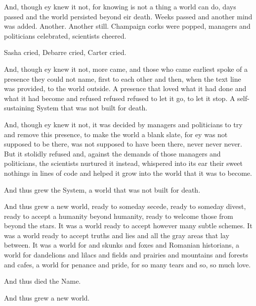 And, though ey knew it not, for knowing is not a thing a world can do, days passed and the world persisted beyond eir death. Weeks passed and another mind was added. Another. Another still. Champaign corks were popped, managers and politicians celebrated, scientists cheered.

Sasha cried, Debarre cried, Carter cried.

And, though ey knew it not, more came, and those who came earliest spoke of a presence they could not name, first to each other and then, when the text line was provided, to the world outside. A presence that loved what it had done and what it had become and refused refused refused to let it go, to let it stop. A self-sustaining System that was not built for death.

And, though ey knew it not, it was decided by managers and politicians to try and remove this presence, to make the world a blank slate, for ey was not supposed to be there, was not supposed to have been there, never never never. But it stolidly refused and, against the demands of those managers and politicians, the scientists nurtured it instead, whispered into its ear their sweet nothings in lines of code and helped it grow into the world that it was to become.

And thus grew the System, a world that was not built for death.

And thus grew a new world, ready to someday secede, ready to someday divest, ready to accept a humanity beyond humanity, ready to welcome those from beyond the stars. It was a world ready to accept however many subtle schemes. It was a world ready to accept truths and lies and all the gray areas that lay between. It was a world for and skunks and foxes and Romanian historians, a world for dandelions and lilacs and fields and prairies and mountains and forests and cafes, a world for penance and pride, for so many tears and so, so much love.

And thus died the Name.

And thus grew a new world.
